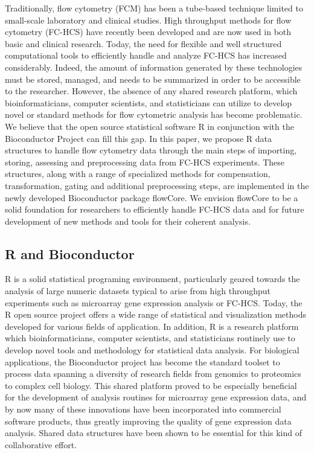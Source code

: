 \documentclass[12pt]{article}
\begin{document}
Traditionally, flow cytometry (FCM) has been a tube-based technique
limited to small-scale laboratory and clinical studies.  High
throughput methods for flow cytometry (FC-HCS) have recently been
developed and are now used in both basic and clinical research. Today,
the need for flexible and well structured computational tools to
efficiently handle and analyze FC-HCS has increased
considerably. Indeed, the amount of information generated by these
technologies must be stored, managed, and needs to be summarized in
order to be accessible to the researcher. However, the absence of any
shared research platform, which bioinformaticians, computer scientists,
and statisticians can utilize to develop novel or standard methods for
flow cytometric analysis has become problematic. We believe that the open
source statistical software R in conjunction with the Bioconductor
Project can fill this gap.  In this paper, we propose R data
structures to handle flow cytometry data through the main steps of
importing, storing, assessing and preprocessing data from FC-HCS
experiments. These structures, along with a range of specialized
methods for compensation, transformation, gating and additional
preprocessing steps, are implemented in the newly developed
Bioconductor package flowCore.  We envision flowCore to be a solid
foundation for researchers to efficiently handle FC-HCS data and for
future development of new methods and tools for their coherent
analysis.


\subsection{R and Bioconductor}
R is a solid statistical programing environment, particularly geared
towards the analysis of large numeric datasets typical to arise from
high throughput experiments such as microarray gene expression analysis
or FC-HCS. Today, the R open source project offers a wide range of
statistical and visualization methods developed for various fields of
application. In addition, R is a research platform which
bioinformaticians, computer scientists, and statisticians routinely
use to develop novel tools and methodology for statistical data
analysis. For biological applications, the Bioconductor project has
become the standard toolset \citep{gentleman2006bos} to process data
spanning a diversity of research fields from genomics to proteomics to
complex cell biology. This shared platform proved to be especially
beneficial for the development of analysis routines for microarray gene
expression data, and by now many of these innovations have been
incorporated into commercial software products, thus greatly improving
the quality of gene expression data analysis. Shared data structures
have been shown to be essential for this kind of collaborative effort.
\end{document}
